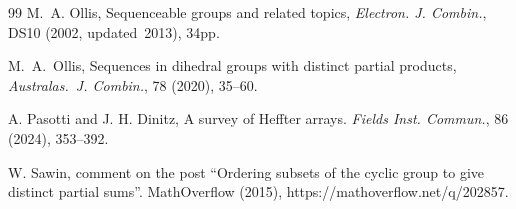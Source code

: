 \documentclass[11pt]{amsart}
\theoremstyle{definition}
\begin{document}
\begin{thebibliography}{99}
M.~A. Ollis, Sequenceable groups and related topics, {\em Electron. J. Combin.}, DS10 (2002, updated~2013), 34pp.

 M.~A.~Ollis, Sequences in dihedral groups with distinct partial products, {\em Australas.~J. Combin.}, 78 (2020), 35--60.

A. Pasotti and J. H. Dinitz, A survey of Heffter arrays. {\em Fields Inst. Commun.}, 86 (2024), 353--392.

W. Sawin, comment on the post “Ordering subsets of the cyclic group to give distinct partial sums”. MathOverflow (2015), https://mathoverflow.net/q/202857.

\end{thebibliography}
\end{document}
